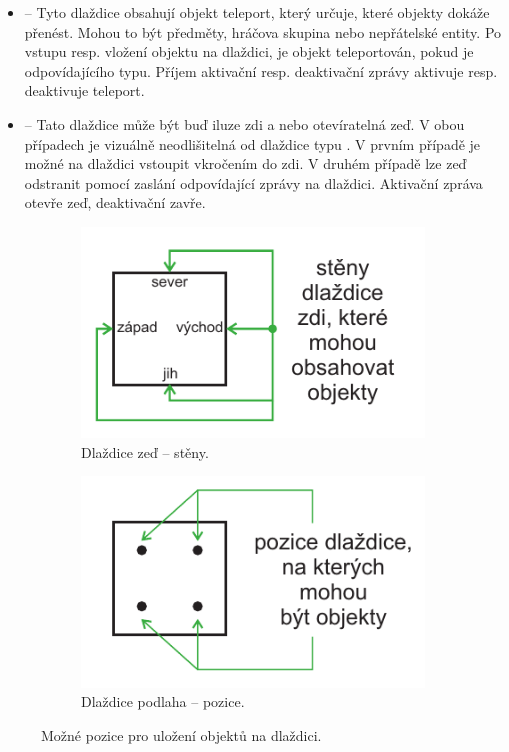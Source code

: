 \begin{itemize}
\item {} -- Tyto dlaždice obsahují objekt teleport, který určuje, které objekty dokáže přenést. Mohou to být
	předměty, hráčova skupina nebo nepřátelské entity. Po vstupu resp. vložení objektu na dlaždici, je objekt teleportován, pokud
	je odpovídajícího typu. Příjem aktivační resp. deaktivační zprávy aktivuje resp. deaktivuje teleport.

\item {} -- Tato dlaždice může být buď iluze zdi a nebo otevíratelná zeď. V obou případech je vizuálně neodlišitelná
	od dlaždice typu . V prvním případě je možné na dlaždici vstoupit vkročením do zdi. V druhém případě lze
	zeď odstranit pomocí zaslání odpovídající zprávy na dlaždici. Aktivační zpráva otevře zeď, deaktivační zavře.
\end{itemize}

	\begin{figure}[H]
    \centering
    \begin{subfigure}[b]{0.45\textwidth}
        \includegraphics[width=\textwidth]{./img/DM-wall-sides}
        \caption{Dlaždice zeď -- stěny.}
        \label{wall:analyza}
    \end{subfigure}
    \begin{subfigure}[b]{0.45\textwidth}
        \includegraphics[width=\textwidth]{./img/DM-floor-spaces}
        \caption{Dlaždice podlaha -- pozice.}
        \label{floor:analyza}
    \end{subfigure}
    \caption{Možné pozice pro uložení objektů na dlaždici.}\label{tile-positions:analyza}
\end{figure}

